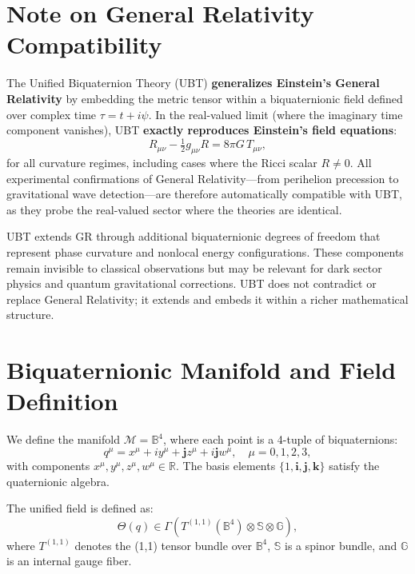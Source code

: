 \documentclass[12pt]{article}
\begin{document}
\section*{Note on General Relativity Compatibility}

The Unified Biquaternion Theory (UBT) \textbf{generalizes Einstein's General Relativity} by embedding the metric tensor within a biquaternionic field defined over complex time $\tau = t + i\psi$. In the real-valued limit (where the imaginary time component vanishes), UBT \textbf{exactly reproduces Einstein's field equations}:
\[
R_{\mu\nu} - \tfrac{1}{2} g_{\mu\nu} R = 8\pi G \, T_{\mu\nu},
\]
for all curvature regimes, including cases where the Ricci scalar $R \neq 0$. All experimental confirmations of General Relativity—from perihelion precession to gravitational wave detection—are therefore automatically compatible with UBT, as they probe the real-valued sector where the theories are identical.

UBT extends GR through additional biquaternionic degrees of freedom that represent phase curvature and nonlocal energy configurations. These components remain invisible to classical observations but may be relevant for dark sector physics and quantum gravitational corrections. UBT does not contradict or replace General Relativity; it extends and embeds it within a richer mathematical structure.

\section{Biquaternionic Manifold and Field Definition}

We define the manifold \( \mathcal{M} = \mathbb{B}^4 \), where each point is a 4-tuple of biquaternions:
\[
q^\mu = x^\mu + i y^\mu + \mathbf{j} z^\mu + i \mathbf{j} w^\mu, \quad \mu = 0,1,2,3,
\]
with components \( x^\mu, y^\mu, z^\mu, w^\mu \in \mathbb{R} \). The basis elements \( \{1, \mathbf{i}, \mathbf{j}, \mathbf{k}\} \) satisfy the quaternionic algebra.

The unified field is defined as:
\[
\Theta(q) \in \Gamma \left( T^{(1,1)}(\mathbb{B}^4) \otimes \mathbb{S} \otimes \mathbb{G} \right),
\]
where \( T^{(1,1)} \) denotes the (1,1) tensor bundle over \( \mathbb{B}^4 \), \( \mathbb{S} \) is a spinor bundle, and \( \mathbb{G} \) is an internal gauge fiber.
\end{document}
